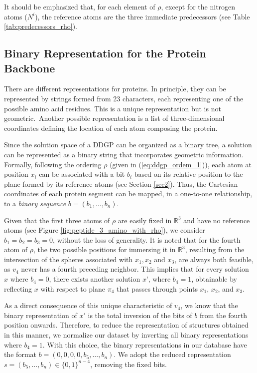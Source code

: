 \documentclass[journal=jacsat,manuscript=article]{achemso}
\begin{document}
It should be emphasized that, for each element of $\rho$, except for the nitrogen atoms ($N^{i}$), the reference atoms are the three immediate predecessors (see Table \ref{tab:predecessors_rho}).

\subsection{Binary Representation for the Protein Backbone}

There are different representations for proteins. In principle, they can be represented by strings formed from 23 characters, each representing one of the possible amino acid residues. This is a unique representation but is not geometric.~Another possible representation is a list of three-dimensional coordinates defining the location of each atom composing the protein.

Since the solution space of a DDGP can be organized as a binary tree, a solution can be represented as a binary string that incorporates geometric information. Formally, following the ordering $\rho$ (given in (\ref{eq:ddgp_ordem_1})), each atom at position $x_i$ can be associated with a bit $b_i$ based on its relative position to the plane formed by its reference atoms (see Section \ref{sec2}). Thus, the Cartesian coordinates of each protein segment can be mapped, in a one-to-one relationship, to a \emph{binary sequence} $b=(b_1,\ldots,b_n)$.

Given that the first three atoms of $\rho$ are easily fixed in $\mathbb{R}^{3}$ and have no reference atoms (see Figure \ref{fig:peptide_3_amino_with_rho}), we consider $b_{1} = b_{2} = b_{3} = 0$, without the loss of generality. It is noted that for the fourth atom of $\rho$, the two possible positions for immersing it in $\mathbb{R}^{3}$, resulting from the intersection of the spheres associated with $x_1,x_2$ and $x_3$, are always both feasible, as $v_{4}$ never has a fourth preceding neighbor. This implies that for every solution $x$ where $b_{4} = 0$, there exists another solution $x’$, where $b_{4} = 1$, obtainable by reflecting $x$ with respect to plane $\pi_4$ that passes through points {$x_{1}$, $x_{2}$, and $x_{3}$}.

As a direct consequence of this unique characteristic of $v_{4}$, we know that the binary representation of $x'$ is the total inversion of the bits of $b$ from the fourth position onwards. Therefore, to reduce the representation of structures obtained in this manner, we normalize our dataset by inverting all binary representations where $b_{4}=1$. With this choice, the binary representations in our database have the format $b=(0,0,0,0,b_{5},\ldots,b_{n})$. We adopt the reduced representation $s=(b_5, \ldots, b_{n}) \in \{0,1\}^{n-4}$, removing the fixed bits.
\end{document}
